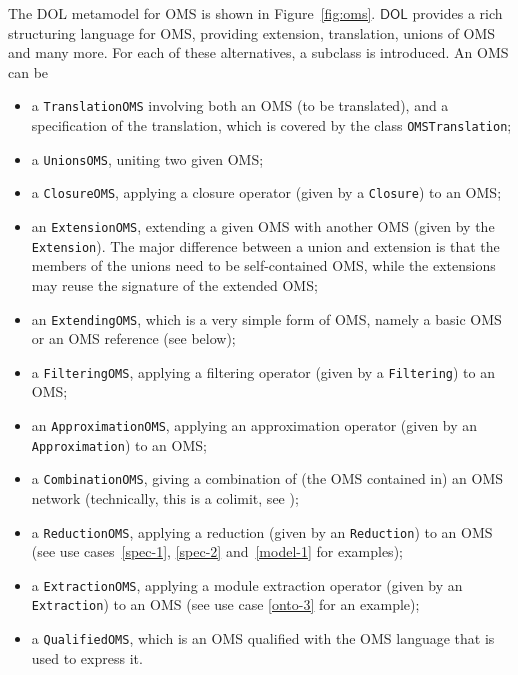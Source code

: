\documentclass[10pt, a4paper]{isov2}
\newcommand*{\syntax}[1]{\texttt{#1}}
\newcommand*{\DOL}{\ensuremath{\mathsf{DOL}}\xspace}
\begin{document}

\label{c:OMS}



The DOL metamodel for OMS is shown in Figure~\ref{fig:oms}.
\DOL provides a rich structuring language for OMS, providing
extension, translation, unions of OMS and many more.  For each of
these alternatives, a subclass is introduced. An OMS can be
\vspace{-1em}
\begin{itemize}[noitemsep]
\item a \syntax{TranslationOMS} involving both
an OMS (to be translated), and a specification of the translation,
which is covered by the class \syntax{OMSTranslation};
\item a \syntax{UnionsOMS}, uniting two given OMS;
\item a \syntax{ClosureOMS}, applying a closure operator
(given by a \syntax{Closure}) to an OMS;
\item an \syntax{ExtensionOMS}, extending a given OMS with another OMS
  (given by the \syntax{Extension}). The major difference between a
  union and extension is that the members of the unions need to be
  self-contained OMS, while the extensions may reuse the signature of
  the extended OMS;
\item an \syntax{ExtendingOMS}, which is a very simple form of OMS,
namely a basic OMS or an OMS reference (see below);
\item a \syntax{FilteringOMS}, applying a filtering operator
(given by a \syntax{Filtering}) to an OMS;
\item an \syntax{ApproximationOMS}, applying an approximation operator
(given by an \syntax{Approximation}) to an OMS;
\item a \syntax{CombinationOMS}, giving a combination of (the OMS
  contained in) an OMS network (technically, this is a colimit, see
  \cite{ZimmermanEtAl06});
\item a \syntax{ReductionOMS}, applying a reduction
(given by an \syntax{Reduction}) to an OMS (see use cases~\ref{spec-1}, \ref{spec-2} and~\ref{model-1}  for examples);
\item a \syntax{ExtractionOMS}, applying a module extraction operator
(given by an \syntax{Extraction}) to an OMS
 (see use case \ref{onto-3} for an example);
\item a \syntax{QualifiedOMS}, which is an OMS qualified with the OMS
  language that is used to express it.
\end{itemize}
\end{document}
